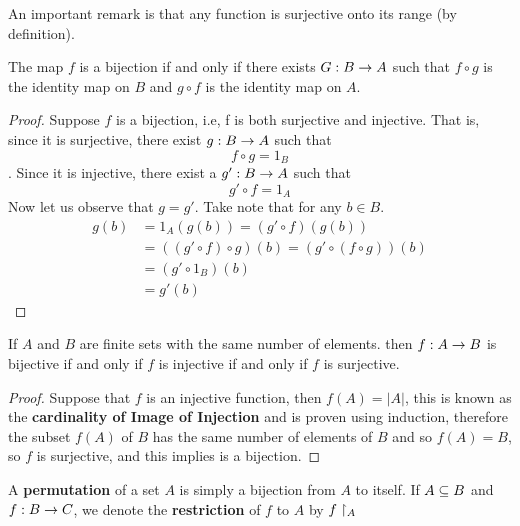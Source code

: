 An important remark is that any function is surjective onto its range (by definition).

\begin{lem}
	The map $f$ is a bijection if and only if there exists $ G : B \rightarrow A $ such that $f \circ g$ is the identity map on $B$ and $ g \circ f $ is the identity map on  $A$.
\end{lem}
\begin{proof}
	Suppose $f$ is a bijection, i.e, f is both surjective and injective. That is, since it is surjective, there exist $ g : B \rightarrow A $ such that
	\[ f \circ g = 1_B \].
	Since it is injective, there exist a $ g' : B \rightarrow A $ such that
	\[ g' \circ f = 1_A \]
	Now let us observe that $g = g'$. Take note that for any $b \in B$.
	\begin{align*}
		g(b) &= 1_A(g(b)) = (g' \circ f)(g(b)) \\
		&= ((g' \circ f)\circ g)(b) = (g'\circ(f \circ g))(b) \\
		&= (g'\circ 1_B)(b) \\
		&= g'(b)
	\end{align*}
\end{proof}
\begin{lem}
	If $A$ and $B$ are finite sets with the same number of elements. then $f : A \rightarrow B$ is bijective if and only if $f$ is injective if and only if $f$ is surjective.
\end{lem}
\begin{proof}
	Suppose that $f$ is an injective function, then $f(A) = |A|$, this is known as the \textbf{cardinality of Image of Injection} and is proven using induction, therefore the subset $f(A)$ of $B$ has the same number of elements of $B$ and so $f(A) = B$, so $f$ is surjective, and this implies is a bijection.
\end{proof}

A \textbf{permutation} of a set $A$ is simply a bijection from $A$ to itself.
If $A \subseteq B$ and $ f : B \rightarrow C $, we denote the \textbf{restriction} of $f$ to $A$ by $ f\restriction_{A} $
